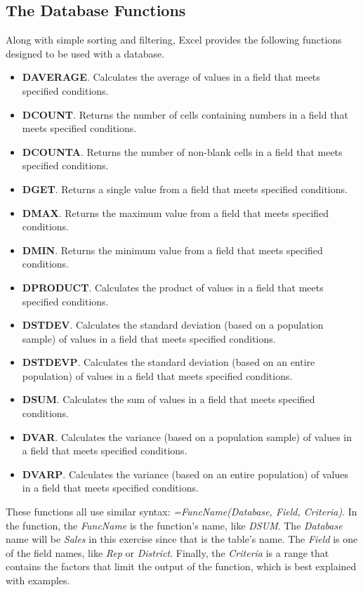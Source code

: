 \subsection{The Database Functions}

Along with simple sorting and filtering, Excel provides the following functions designed to be used with a database. 

\begin{itemize}
	\item \textbf{DAVERAGE}. Calculates the average of values in a field that meets specified conditions.
	\item \textbf{DCOUNT}. Returns the number of cells containing numbers in a field that meets specified conditions.
	\item \textbf{DCOUNTA}. Returns the number of non-blank cells in a field that meets specified conditions.
	\item \textbf{DGET}. Returns a single value from a field that meets specified conditions.
	\item \textbf{DMAX}. Returns the maximum value from a field that meets specified conditions.
	\item \textbf{DMIN}. Returns the minimum value from a field that meets specified conditions.
	\item \textbf{DPRODUCT}. Calculates the product of values in a field that meets specified conditions.
	\item \textbf{DSTDEV}. Calculates the standard deviation (based on a population sample) of values in a field that meets specified conditions.
	\item \textbf{DSTDEVP}. Calculates the standard deviation (based on an entire population) of values in a field that meets specified conditions.
	\item \textbf{DSUM}. Calculates the sum of values in a field that meets specified conditions.
	\item \textbf{DVAR}. Calculates the variance (based on a population sample) of values in a field that meets specified conditions.
	\item \textbf{DVARP}. Calculates the variance (based on an entire population) of values in a field that meets specified conditions.
\end{itemize}

These functions all use similar syntax: \textit{=FuncName(Database, Field, Criteria)}. In the function, the \textit{FuncName} is the function's name, like \textit{DSUM}. The \textit{Database} name will be \textit{Sales} in this exercise since that is the table's name. The \textit{Field} is one of the field names, like \textit{Rep} or \textit{District}. Finally, the \textit{Criteria} is a range that contains the factors that limit the output of the function, which is best explained with examples.

